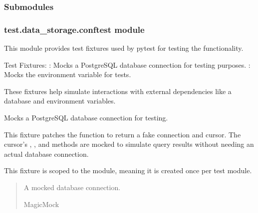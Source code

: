 \documentclass[letterpaper,10pt,english]{sphinxmanual}
\begin{document}
\subsubsection{Submodules}
\label{\detokenize{test.data_storage:submodules}}

\subsubsection{test.data\_storage.conftest module}
\label{\detokenize{test.data_storage:module-test.data_storage.conftest}}\label{\detokenize{test.data_storage:test-data-storage-conftest-module}}
\sphinxAtStartPar
This module provides test fixtures used by pytest for testing the  functionality.

\sphinxAtStartPar
Test Fixtures:
\sphinxhyphen{} : Mocks a PostgreSQL database connection for testing purposes.
\sphinxhyphen{} : Mocks the environment variable  for tests.

\sphinxAtStartPar
These fixtures help simulate interactions with external dependencies like a database and environment variables.

\begin{fulllineitems}
\label{\detokenize{test.data_storage:test.data_storage.conftest.mock_db_connection}}
\pysigstartsignatures
\pysiglinewithargsret
{}
{}
{}
\pysigstopsignatures
\sphinxAtStartPar
Mocks a PostgreSQL database connection for testing.

\sphinxAtStartPar
This fixture patches the  function to return a fake connection and cursor.
The cursor’s , , and  methods are mocked to simulate query results
without needing an actual database connection.

\sphinxAtStartPar
This fixture is scoped to the module, meaning it is created once per test module.
\begin{quote}\begin{description}
\sphinxAtStartPar
A mocked database connection.

\sphinxAtStartPar
MagicMock

\end{description}\end{quote}

\end{fulllineitems}
\end{document}
